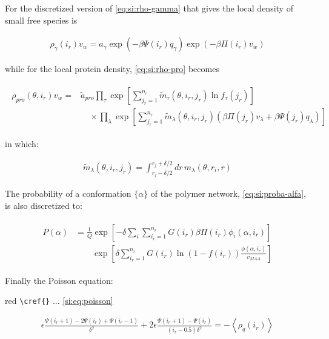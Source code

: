 \documentclass[journal=jacsat,manuscript=suppinfo]{achemso}
\begin{document}
For the discretized version of \cref{eq:si:rho-gamma} that gives the local density of small free species is

\begin{align}
	\rho_\gamma(i_r)v_w = a_\gamma \exp{\left(-\beta \Psi(i_r)q_\gamma\right)} \exp{\left(-\beta\Pi(i_r) v_w\right)}
\end{align}



while for the local protein density, \cref{eq:si:rho-pro} becomes



\begin{align}
	\begin{aligned}
		\rho_{pro}(\theta, i_r)v_w = &\tilde{a}_{pro} \prod_\tau\exp\left[ \sum^{n_r}_{j_r = 1} \tilde{m}_\tau(\theta,i_r,j_r) \ln f_\tau(j_r)\right] \\
		& \hspace{1em} \times \prod_\lambda \exp \left[ \sum^{n_r}_{j_r = 1} \tilde{m}_\lambda(\theta,i_r, j_r)\left(\beta\Pi(j_r) v_\lambda+ \beta \Psi(j_r)q_\lambda\right) \right]
	\end{aligned}
\end{align}

\noindent in which:

\begin{align}
	\tilde{m}_\lambda(\theta,i_r,j_r) =\int_{r_j -\delta/2}^{r_j + \delta/2} dr \, m_\lambda(\theta, r_i, r) 
\end{align}


The probability of a conformation $\{\alpha\}$ of the polymer network, \ref{eq:si:proba-alfa}, is also discretized to:

\begin{align}
	\begin{aligned}
		P(\alpha)&=\frac{1}{Q}\exp\left[- \delta\sum_i{\sum_{i_r =1}^{n_r}{G(i_r)\beta\Pi(i_r)\phi_i(\alpha,i_r)}}\right] \\
		&\hspace{2em} \exp\left[\delta\sum_{i_r =1}^{n_r}{G(i_r)\ln(1-f(i_r))\frac{\phi(\alpha,i_r)}{v_{MAA}}}\right]
	\end{aligned}
\end{align}

Finally the Poisson equation:
\begin{color}{red}
	\verb|\cref{}| ... \ref{si:eq:poisson}
\end{color}

\begin{align}
	\epsilon \frac{\Psi(i_r +1) -2 \Psi(i_r) + \Psi(i_r -1)}{\delta ^2} + 2\epsilon \frac{\Psi(i_r +1) -\Psi(i_r)}{(i_r -0.5)\delta ^2}= -\left<\rho_q(i_r)\right>
	\label{si:eq:poisson-ir}
\end{align}
\end{document}
